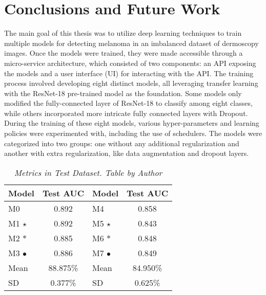 \chapter{Conclusions and Future Work}
\label{cap:concl}

The main goal of this thesis was to utilize deep learning techniques to train
multiple models for detecting melanoma in an imbalanced dataset of dermoscopy
images. Once the models were trained, they were made accessible through a
micro-service architecture, which consisted of two components: an API exposing
the models and a user interface (UI) for interacting with the API. The training
process involved developing eight distinct models, all leveraging transfer
learning with the ResNet-18 pre-trained model as the foundation. Some models
only modified the fully-connected layer of ResNet-18 to classify among eight
classes, while others incorporated more intricate fully connected layers with
Dropout. \\

During the training of these eight models, various hyper-parameters and learning
policies were experimented with, including the use of schedulers. The models
were categorized into two groups: one without any additional regularization and
another with extra regularization, like data augmentation and dropout layers.


\begin{table}[H]
\centering
\begin{tabular}{lc|lc}
    \toprule
  \textbf{Model} & \textbf{Test AUC} & \cellcolor{gray!50}\textbf{Model} & \cellcolor{gray!50}\textbf{Test AUC}  \\
\midrule
 M0 & 0.892 & \cellcolor{gray!50}M4 & \cellcolor{gray!50}0.858 \\
 M1 $\star$ & 0.892 & \cellcolor{gray!50}M5 $\star$ & \cellcolor{gray!50}0.843 \\
 M2 $\ast$ &  0.885 &  \cellcolor{gray!50}M6 $\ast$ & \cellcolor{gray!50}0.848 \\
 M3 $\bullet$ & 0.886 & \cellcolor{gray!50}M7 $\bullet$ & \cellcolor{gray!50}0.849 \\
 \midrule
Mean &  88.875\% & \cellcolor{gray!50}Mean & \cellcolor{gray!50}84.950\%  \\
SD &  0.377\%  &   \cellcolor{gray!50}SD &  \cellcolor{gray!50}0.625\%  \\

\bottomrule
\end{tabular}
\caption[Metrics in Test Dataset]
  {\textit{Metrics in Test Dataset. Table by Author}}
{\label{table:test-set-resume-metrics}}
\end{table}

